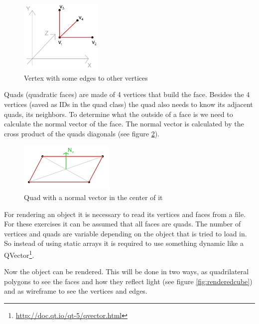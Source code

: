 \documentclass[11.5pt,oneside,a4paper]{scrartcl}
\newcounter{ct}
\begin{document}
\begin{figure}
	\centering
	\includegraphics[width=0.35\textwidth]{vertex.png}
	\caption{Vertex with some edges to other vertices}
	\label{fig:vertex}
	\vspace{0.6cm}
\end{figure}

Quads (quadratic faces) are made of 4 vertices that build the face. Besides the 4 vertices (saved as IDs in the quad class) the quad also needs to know its adjacent quads, its neighbors. To determine what the outside of a face is we need to calculate the normal vector of the face. The normal vector is calculated by the cross product of the quads diagonals (see figure \ref{fig:quad}).

\begin{figure}
	\centering
	\includegraphics[width=0.4\textwidth]{quad.png}
	\caption{Quad with a normal vector in the center of it}
	\label{fig:quad}
	\vspace{-1cm}
\end{figure}

For rendering an object it is necessary to read its vertices and faces from a file. For these exercises it can be assumed that all faces are quads. The number of vertices and quads are variable depending on the object that is tried to load in. So instead of using static arrays it is required to use something dynamic like a QVector\footnote{\url{http://doc.qt.io/qt-5/qvector.html}}.

Now the object can be rendered. This will be done in two ways, as quadrilateral polygons to see the faces and how they reflect light (see figure \ref{fig:renderedcube}) and as wireframe to see the vertices and edges.
\end{document}
